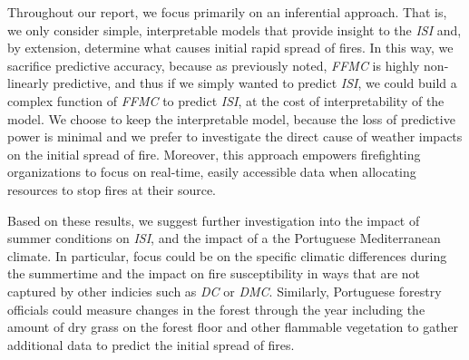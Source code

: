 \documentclass{article}
\begin{document}
Throughout our report, we focus primarily on an inferential approach. That is, we only consider simple, interpretable models that provide insight to the \textit{ISI} and, by extension, determine what causes initial rapid spread of fires. In this way, we sacrifice predictive accuracy, because as previously noted, \textit{FFMC} is highly non-linearly predictive, and thus if we simply wanted to predict \textit{ISI}, we could build a complex function of \textit{FFMC} to predict \textit{ISI}, at the cost of interpretability of the model. We choose to keep the interpretable model, because the loss of predictive power is minimal and we prefer to investigate the direct cause of weather impacts on the initial spread of fire. Moreover, this approach empowers firefighting organizations to focus on real-time, easily accessible data when allocating resources to stop fires at their source.   

Based on these results, we suggest further investigation into the impact of summer conditions on \textit{ISI}, and the impact of a the Portuguese Mediterranean climate. In particular, focus could be on the specific climatic differences during the summertime and the impact on fire susceptibility in ways that are not captured by other indicies such as \textit{DC} or \textit{DMC}. Similarly, Portuguese forestry officials could measure changes in the forest through the year including the amount of dry grass on the forest floor and other flammable vegetation to gather additional data to predict the initial spread of fires.
\end{document}
